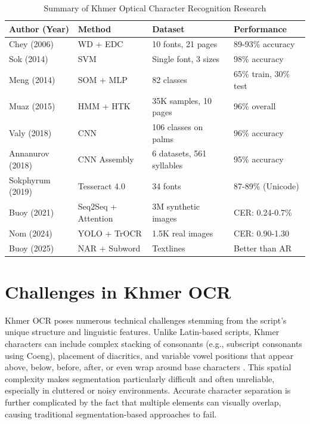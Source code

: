 \begin{table}[H]
\centering
\caption{Summary of Khmer Optical Character Recognition Research}
\renewcommand{\arraystretch}{1.5}
\begin{tabular}{|p{3.5cm}|p{3.8cm}|p{5cm}|p{3.5cm}|}
\hline
\textbf{Author (Year)} & \textbf{Method} & \textbf{Dataset} & \textbf{Performance} \\
\hline
Chey (2006) & WD + EDC & 10 fonts, 21 pages & 89-93\% accuracy \\
\hline
Sok (2014) & SVM & Single font, 3 sizes & 98\% accuracy \\
\hline
Meng (2014) & SOM + MLP & 82 classes & 65\% train, 30\% test \\
\hline
Muaz (2015) & HMM + HTK & 35K samples, 10 pages & 96\% overall \\
\hline
Valy (2018) & CNN & 106 classes on palms & 96\% accuracy \\
\hline
Annanurov (2018) & CNN Assembly & 6 datasets, 561 syllables & 95\% accuracy \\
\hline
Sokphyrum (2019) & Tesseract 4.0 & 34 fonts & 87-89\% (Unicode) \\
\hline
Buoy (2021) & Seq2Seq + Attention & 3M synthetic images & CER: 0.24-0.7\% \\
\hline
Nom (2024) & YOLO + TrOCR & 1.5K real images & CER: 0.90-1.30 \\
\hline
Buoy (2025) & NAR + Subword & Textlines & Better than AR \\
\hline
\end{tabular}
\label{tab:khmer_ocr_summary}
\end{table}


\section{Challenges in Khmer OCR}
\label{sec:datasets}

Khmer OCR poses numerous technical challenges stemming from the script's unique structure and 
linguistic features. Unlike Latin-based scripts, Khmer characters can include complex stacking 
of consonants (e.g., subscript consonants using Coeng), placement of diacritics, and variable vowel 
positions that appear above, below, before, after, or even wrap around base characters \citep{buoy2021seq2seq}. 
This spatial complexity makes segmentation particularly difficult and often unreliable, 
especially in cluttered or noisy environments. Accurate character separation is further complicated 
by the fact that multiple elements can visually overlap, causing traditional segmentation-based 
approaches to fail.

